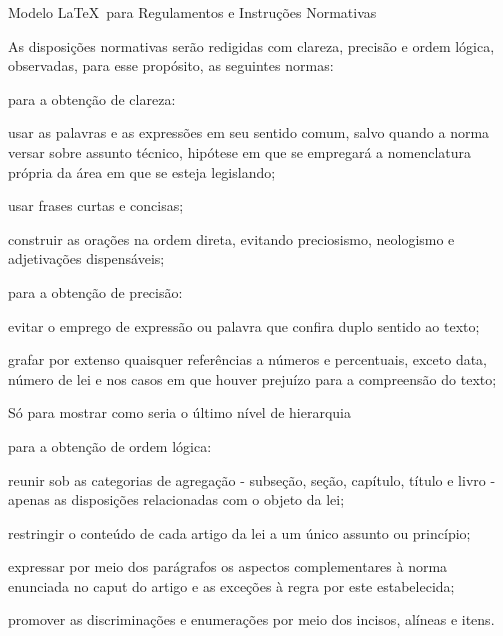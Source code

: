 \documentclass[11pt,twoside,a4paper]{inifsc}
\begin{document}
\begin{normativa}{Modelo \LaTeX~para Regulamentos e Instruções Normativas}
\begin{artigo}
    \item As disposições normativas serão redigidas com clareza, precisão e ordem lógica, observadas, para esse propósito, as seguintes normas: 
    \begin{inciso}
        \item para a obtenção de clareza:
        \begin{inciso}
            \item usar as palavras e as expressões em seu sentido comum, salvo quando a norma versar sobre assunto técnico, hipótese em que se empregará a nomenclatura própria da área em que se esteja legislando;
            \item usar frases curtas e concisas;
            \item construir as orações na ordem direta, evitando preciosismo, neologismo e adjetivações dispensáveis;
        \end{inciso}
        \item para a obtenção de precisão:
        \begin{inciso}
            \item evitar o emprego de expressão ou palavra que confira duplo sentido ao texto;
            \item grafar por extenso quaisquer referências a números e percentuais, exceto data, número de lei e nos casos em que houver prejuízo para a compreensão do texto; 
            \begin{inciso}
                \item Só para mostrar como seria o último nível de hierarquia
            \end{inciso}
        \end{inciso}
        \item para a obtenção de ordem lógica:
        \begin{inciso}
            \item reunir sob as categorias de agregação - subseção, seção, capítulo, título e livro - apenas as disposições relacionadas com o objeto da lei;
            \item restringir o conteúdo de cada artigo da lei a um único assunto ou princípio;
            \item expressar por meio dos parágrafos os aspectos complementares à norma enunciada no caput do artigo e as exceções à regra por este estabelecida;
            \item promover as discriminações e enumerações por meio dos incisos, alíneas e itens.
        \end{inciso}
    \end{inciso}
\end{artigo}




\end{normativa}
\end{document}
